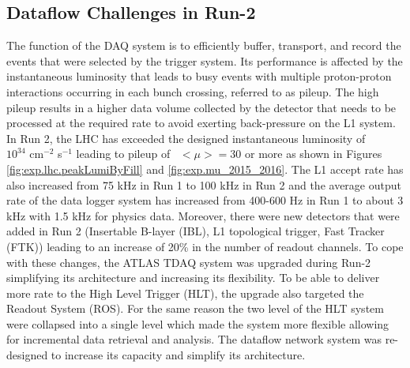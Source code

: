 \subsection{Dataflow Challenges in Run-2}
The function of the DAQ system is to efficiently buffer, transport, and record the events that were selected by the trigger system. 
Its performance is affected by the instantaneous luminosity that leads to busy events with multiple proton-proton interactions occurring in each 
bunch crossing, referred to as pileup. The high pileup results in a higher data volume collected by the detector that needs to be 
processed at the required rate to avoid exerting back-pressure on the L1 system. 
In Run 2, the LHC has exceeded the designed instantaneous luminosity of \\$10^{34}$ cm$^{-2}$ s$^{-1}$ leading to pileup of~ $<\mu>=30$ or more as shown 
in Figures \ref{fig:exp.lhc.peakLumiByFill} and \ref{fig:exp.mu_2015_2016}.
The L1 accept 
rate has also increased from 75 kHz in Run 1 to 100 kHz in Run 2 and the average output rate of the data logger system has 
increased from 400-600 Hz in Run 1 to about 3 kHz with 1.5 kHz for physics data. 
Moreover, there were new detectors that were added in Run 2
(Insertable B-layer (IBL), L1 topological trigger, Fast Tracker (FTK))\cite{Aad:1602235} leading to 
an increase of 20\% in the number of readout channels. 
To cope with these changes, the ATLAS TDAQ system was upgraded during Run-2
simplifying its architecture and increasing its flexibility.
To be able to deliver more rate to the High Level Trigger (HLT), the upgrade also targeted the Readout System (ROS)\cite{PanduroVazquez2016939}. 
For the same reason the two level of the HLT system were collapsed into a single level which made the system more flexible 
 allowing for incremental data retrieval and analysis. 
The dataflow network system was re-designed to increase its capacity and simplify its architecture\cite{1742-6596-396-1-012033}.

